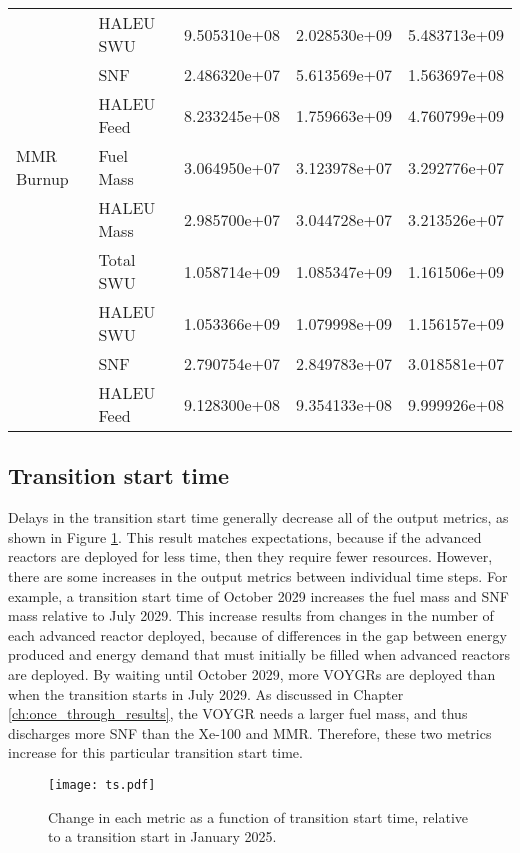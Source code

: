 \begin{table}[ht]
\begin{tabular}{llrrr}
                      &  HALEU SWU & 9.505310e+08 & 2.028530e+09 & 5.483713e+09 \\
                      &        SNF & 2.486320e+07 & 5.613569e+07 & 1.563697e+08 \\
                      & HALEU Feed & 8.233245e+08 & 1.759663e+09 & 4.760799e+09 \\\hline 
        MMR Burnup &  Fuel Mass & 3.064950e+07 & 3.123978e+07 & 3.292776e+07 \\
                   & HALEU Mass & 2.985700e+07 & 3.044728e+07 & 3.213526e+07 \\
                   &  Total SWU & 1.058714e+09 & 1.085347e+09 & 1.161506e+09 \\
                   &  HALEU SWU & 1.053366e+09 & 1.079998e+09 & 1.156157e+09 \\
                   &        SNF & 2.790754e+07 & 2.849783e+07 & 3.018581e+07 \\
                   & HALEU Feed & 9.128300e+08 & 9.354133e+08 & 9.999926e+08 \\
        \hline
    \end{tabular}
\end{table}


\subsection{Transition start time}
Delays in the transition start time generally decrease all of the output 
metrics, as shown in Figure \ref{fig:ts_scenario7}. This result matches 
expectations, because if the advanced reactors are deployed for less time, 
then they require fewer resources. However, there are some increases in 
the output metrics between individual time steps. For example, a transition 
start time of October 2029 increases the fuel mass and \gls{SNF} mass 
relative to July 2029. This increase results from changes in the number 
of each advanced reactor deployed, because of differences in the gap 
between energy produced and energy demand that must initially be filled when 
advanced reactors are deployed. By waiting until October 2029, more VOYGRs 
are deployed than when the transition starts in July 2029. As discussed in 
Chapter \ref{ch:once_through_results}, the VOYGR needs a larger fuel mass, 
and thus discharges more \gls{SNF} than the Xe-100 and \gls{MMR}. Therefore, 
these two metrics increase for this particular transition start time. 

\begin{figure}[ht]
    \centering
    \texttt{[image: ts.pdf]}
    \caption{Change in each metric as a function of transition start 
    time, relative to a transition start in January 2025.}
    \label{fig:ts_scenario7}
\end{figure}

